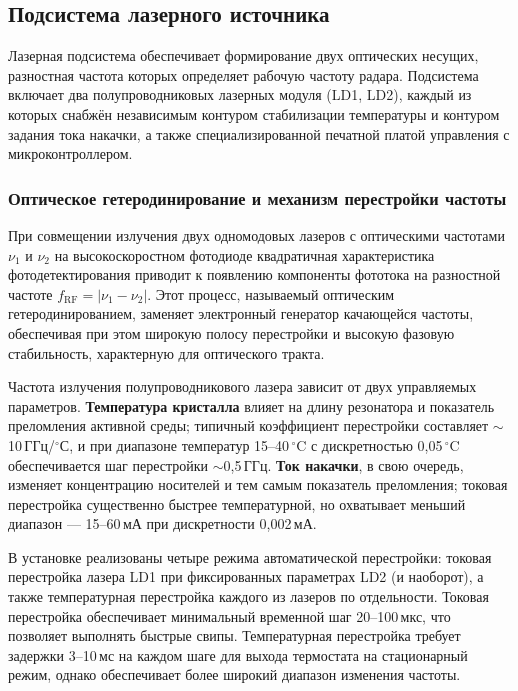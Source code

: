 \subsection{Подсистема лазерного источника}

Лазерная подсистема обеспечивает формирование двух оптических несущих,
разностная частота которых определяет рабочую частоту радара. Подсистема
включает два полупроводниковых лазерных модуля (LD1, LD2), каждый из которых
снабжён независимым контуром стабилизации температуры и контуром задания тока
накачки, а также специализированной печатной платой управления с
микроконтроллером.

\subsubsection{Оптическое гетеродинирование и механизм перестройки частоты}

При совмещении излучения двух одномодовых лазеров с оптическими частотами
$\nu_1$ и $\nu_2$ на высокоскоростном фотодиоде квадратичная характеристика
фотодетектирования приводит к появлению компоненты фототока на разностной
частоте $f_{\mathrm{RF}} = |\nu_1 - \nu_2|$. Этот процесс, называемый
оптическим гетеродинированием, заменяет электронный генератор качающейся
частоты, обеспечивая при этом широкую полосу перестройки и высокую фазовую
стабильность, характерную для оптического тракта.

Частота излучения полупроводникового лазера зависит от двух управляемых
параметров. \textbf{Температура кристалла} влияет на длину резонатора и
показатель преломления активной среды; типичный коэффициент перестройки
составляет $\sim$10\,ГГц/$^\circ$С, и при диапазоне температур
15--40\,$^\circ$C с дискретностью 0{,}05\,$^\circ$C обеспечивается шаг
перестройки $\sim$0{,}5\,ГГц. \textbf{Ток накачки}, в свою очередь, изменяет
концентрацию носителей и тем самым показатель преломления; токовая перестройка
существенно быстрее температурной, но охватывает меньший диапазон ---
15--60\,мА при дискретности 0{,}002\,мА.

В установке реализованы четыре режима автоматической перестройки: токовая
перестройка лазера LD1 при фиксированных параметрах LD2 (и наоборот), а также
температурная перестройка каждого из лазеров по отдельности. Токовая перестройка
обеспечивает минимальный временной шаг 20--100\,мкс,
что позволяет выполнять быстрые свипы. Температурная перестройка требует
задержки 3--10\,мс на каждом шаге для выхода термостата на стационарный
режим, однако обеспечивает более широкий диапазон изменения частоты.

